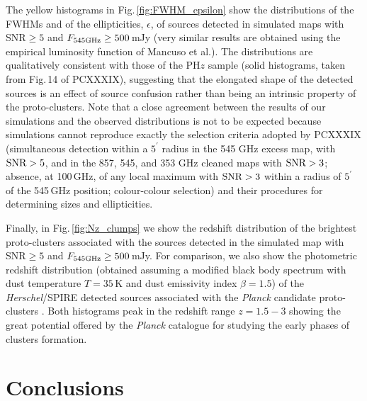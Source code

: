 \documentclass[useAMS,usenatbib]{mn2e}
\begin{document}
The yellow histograms in Fig.\,\ref{fig:FWHM_epsilon} show the distributions of the FWHMs and of the ellipticities, $\epsilon$, of
sources detected in simulated maps with SNR$\geq5$  and $F_{\rm
  545GHz}\ge500\,$mJy (very similar results are obtained using
  the  empirical luminosity function of Mancuso et al.). The distributions are qualitatively consistent with those of the PH$z$ sample (solid histograms, taken from Fig.\,14 of PCXXXIX), suggesting that the elongated shape of the detected sources is an effect of source confusion rather than being an intrinsic property of the proto-clusters. Note that a close agreement between the results of our simulations and the observed distributions is not to be expected because simulations cannot reproduce exactly the selection criteria adopted by PCXXXIX (simultaneous detection within a $5^\prime$ radius in the 545 GHz excess map, with $\hbox{SNR}>5$, and in the 857, 545, and 353 GHz cleaned maps with $\hbox{SNR}>3$; absence, at 100\,GHz, of any local maximum with $\hbox{SNR}>3$  within a radius of $5^\prime$ of the 545\,GHz position; colour-colour selection) and their procedures for determining sizes and ellipticities.

Finally, in Fig.\,\ref{fig:Nz_clumps} we show the redshift distribution of the brightest proto-clusters associated with the
sources detected in the simulated map with SNR$\geq5$ and $F_{\rm
  545GHz}\ge500\,$mJy. For comparison, we also show the
photometric redshift distribution (obtained
assuming a modified black body spectrum with dust temperature
$T=35\,$K and dust emissivity index $\beta=1.5$) of the {\it
  Herschel}/SPIRE detected sources
associated with the {\it Planck} candidate proto-clusters \citep[][
black histogram in the same figure]{PlanckCollaborationXXVII2015}.
Both histograms peak in the redshift range $z=1.5-3$ showing
the great potential offered by the {\it Planck} catalogue for studying the
early phases of clusters formation.





\section{Conclusions}\label{sec:conclusions}
\end{document}
